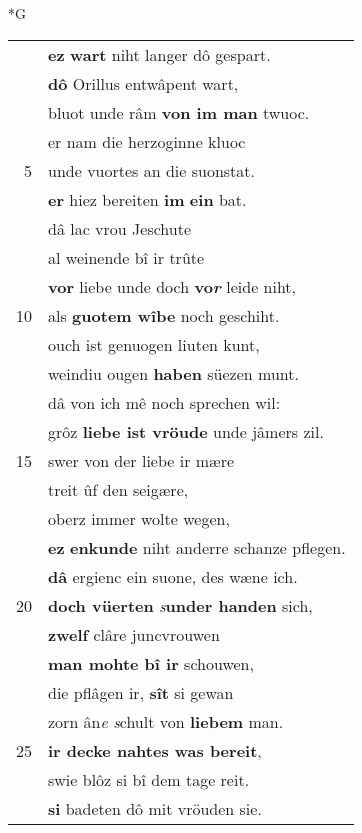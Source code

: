 \documentclass[8pt,a4paper,notitlepage]{article}
\begin{document}
\newpage
\begin{table}[ht]
\begin{minipage}[t]{0.5\linewidth}
\small
\begin{center}*G
\end{center}
\begin{tabular}{rl}
 & \textbf{ez} \textbf{wart} niht langer dô gespart.\\ 
 & \textbf{dô} Orillus entwâpent wart,\\ 
 & bluot unde râm \textbf{von im man} twuoc.\\ 
 & er nam die herzoginne kluoc\\ 
5 & unde vuortes an die suonstat.\\ 
 & \textbf{er} hiez bereiten \textbf{im} \textbf{ein} bat.\\ 
 & dâ lac vrou Jeschute\\ 
 & al weinende bî ir trûte\\ 
 & \textbf{vor} liebe unde doch \textbf{vo\textit{r}} leide niht,\\ 
10 & als \textbf{guotem wîbe} noch geschiht.\\ 
 & ouch ist genuogen liuten kunt,\\ 
 & weindiu ougen \textbf{haben} süezen munt.\\ 
 & dâ von ich mê noch sprechen wil:\\ 
 & grôz \textbf{liebe ist vröude} unde jâmers zil.\\ 
15 & swer von der liebe ir mære\\ 
 & treit ûf den seigære,\\ 
 & oberz immer wolte wegen,\\ 
 & \textbf{ez} \textbf{en}\textbf{kunde} niht anderre schanze pflegen.\\ 
 & \textbf{dâ} ergienc ein suone, des wæne ich.\\ 
20 & \textbf{doch vüerten} \textit{s}\textbf{under handen} sich,\\ 
 & \textbf{zwelf} clâre juncvrouwen\\ 
 & \textbf{man mohte bî ir} schouwen,\\ 
 & die pflâgen ir, \textbf{sît} si gewan\\ 
 & zorn ân\textit{e} \textit{s}chult von \textbf{liebem} man.\\ 
25 & \textbf{ir decke nahtes was bereit},\\ 
 & swie blôz si bî dem tage reit.\\ 
 & \textbf{si} badeten dô mit vröuden sie.\\ 

\end{tabular}
\end{minipage}
\end{table}
\end{document}
